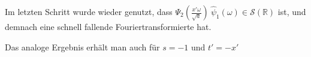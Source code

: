 \documentclass{scrartcl}
\begin{document}
Im letzten Schritt wurde wieder genutzt, dass
$\Psi_2\left(\frac{x' \omega}{\sqrt{a}}\right) ~\hat \psi_1(\omega) \in \mathcal{S}(\mathbb{R})$
ist, und demnach eine schnell fallende Fouriertransformierte hat.








Das analoge Ergebnis erhält man auch für $s=-1$ und $t' = -x'$



\printbibliography
\end{document}
